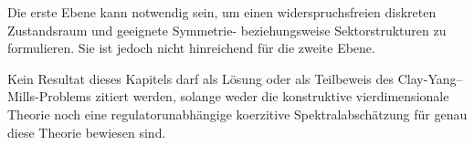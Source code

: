 \documentclass[11pt,a4paper]{article}
\begin{document}
Die erste Ebene kann notwendig sein, um einen widerspruchsfreien
diskreten Zustandsraum und geeignete Symmetrie- beziehungsweise
Sektorstrukturen zu formulieren. Sie ist jedoch nicht hinreichend für die
zweite Ebene.

\begin{warningbox}
Kein Resultat dieses Kapitels darf als Lösung oder als Teilbeweis des
Clay-Yang--Mills-Problems zitiert werden, solange weder die konstruktive
vierdimensionale Theorie noch eine regulatorunabhängige koerzitive
Spektralabschätzung für genau diese Theorie bewiesen sind.
\end{warningbox}
\end{document}
